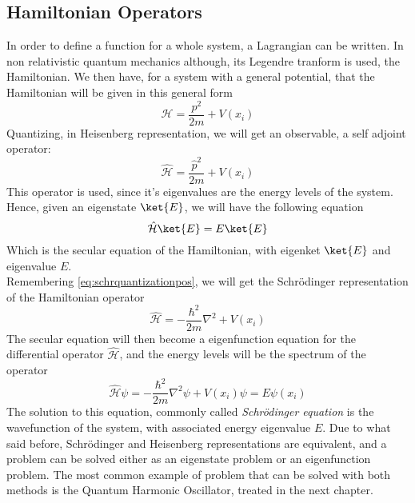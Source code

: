 \documentclass[a4paper, 11pt]{book}
\newcommand{\1}{\opr{\mathds{1}}}
\newcommand{\ham}{\mathcal{H}}
\newcommand{\opr}[1]{\hat{#1}}
\theoremstyle{plain}
\begin{document}
	\subsection{Hamiltonian Operators}
	In order to define a function for a whole system, a Lagrangian can be written. In non relativistic quantum mechanics although, its Legendre tranform is used, the Hamiltonian. We then have, for a system with a general potential, that the Hamiltonian will be given in this general form
	\begin{equation}
		\ham=\frac{p^2}{2m}+V(x_i)
		\label{eq:hamiltonianclass}
	\end{equation}
	Quantizing, in Heisenberg representation, we will get an observable, a self adjoint operator:
	\begin{equation}
		\opr{\ham}=\frac{\opr{p}^2}{2m}+V(x_i)
		\label{eq:quantumham}
	\end{equation}
	This operator is used, since it's eigenvalues are the energy levels of the system.\\
	Hence, given an eigenstate $\ket{E}$, we will have the following equation
	\begin{equation}
		\opr{\ham}\ket{E}=E\ket{E}
		\label{eq:seculareqham}
	\end{equation}
	Which is the secular equation of the Hamiltonian, with eigenket $\ket{E}$ and eigenvalue $E$.\\
	Remembering \eqref{eq:schrquantizationpos}, we will get the Schrödinger representation of the Hamiltonian operator
	\begin{equation}
		\opr{\ham}=-\frac{\hbar^2}{2m}\nabla^2+V(x_i)
		\label{eq:schrham}
	\end{equation}
	The secular equation will then become a eigenfunction equation for the differential operator $\opr{\ham}$, and the energy levels will be the spectrum of the operator
	\begin{equation}
		\opr{\ham}\psi=-\frac{\hbar^2}{2m}\nabla^2\psi+V(x_i)\psi=E\psi(x_i)
		\label{eq:schreigfun}
	\end{equation}
	The solution to this equation, commonly called \textit{Schrödinger equation} is the wavefunction of the system, with associated energy eigenvalue $E$. Due to what said before, Schrödinger and Heisenberg representations are equivalent, and a problem can be solved either as an eigenstate problem or an eigenfunction problem. The most common example of problem that can be solved with both methods is the Quantum Harmonic Oscillator, treated in the next chapter.\\
\end{document}
